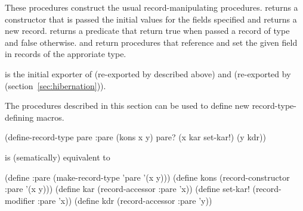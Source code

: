 \begin{protos}
\end{protos}
\noindent

\begin{protos}
\end{protos}
\noindent
These procedures construct the usual record-manipulating procedures.
 returns a constructor that is passed the initial
 values for the fields specified and returns a new record.
 returns a predicate that return true when passed
 a record of type  and false otherwise.
 and  return procedures that
 reference and set the given field in records of the approriate type.

\begin{protos}
\end{protos}
\noindent
\noindent {} is the initial exporter of
 (re-exported by  described above)
 and
 (re-exported by
  (section~\ref{sec:hibernation})).

The procedures described in this section can be used to define new
 record-type-defining macros.
\begin{example}
(define-record-type pare :pare
  (kons x y)
  pare?
  (x kar set-kar!)
  (y kdr))
\end{example}
is (sematically) equivalent to
\begin{example}
(define :pare (make-record-type 'pare '(x y)))
(define kons (record-constructor :pare '(x y)))
(define kar (record-accessor :pare 'x))
(define set-kar! (record-modifier :pare 'x))
(define kdr (record-accessor :pare 'y))
\end{example}

